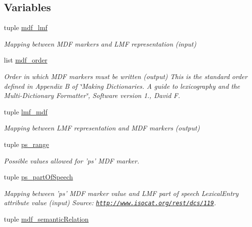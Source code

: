 \subsection*{Variables}
\begin{DoxyCompactItemize}
\item 
tuple \hyperlink{namespacelmf_1_1src_1_1config_1_1mdf_a888cd9df8b9511d408e646dc404b5232}{mdf\+\_\+lmf}
\begin{DoxyCompactList}\small\item\em Mapping between M\+D\+F markers and L\+M\+F representation (input) \end{DoxyCompactList}\item 
list \hyperlink{namespacelmf_1_1src_1_1config_1_1mdf_afe5efb72442beb65b5083335b744845c}{mdf\+\_\+order}
\begin{DoxyCompactList}\small\item\em Order in which M\+D\+F markers must be written (output) This is the standard order defined in Appendix B of \char`\"{}\+Making Dictionaries. A guide to lexicography and the Multi-\/\+Dictionary Formatter\char`\"{}, Software version 1., David F. \end{DoxyCompactList}\item 
tuple \hyperlink{namespacelmf_1_1src_1_1config_1_1mdf_a78d8f1444783c1b86cbbd91f49a0cd4f}{lmf\+\_\+mdf}
\begin{DoxyCompactList}\small\item\em Mapping between L\+M\+F representation and M\+D\+F markers (output) \end{DoxyCompactList}\item 
tuple \hyperlink{namespacelmf_1_1src_1_1config_1_1mdf_a59bb4fce205d8159bc72c946e3855c4a}{ps\+\_\+range}
\begin{DoxyCompactList}\small\item\em Possible values allowed for 'ps' M\+D\+F marker. \end{DoxyCompactList}\item 
tuple \hyperlink{namespacelmf_1_1src_1_1config_1_1mdf_a1e76a452fc77f05851e4369134f5980b}{ps\+\_\+part\+Of\+Speech}
\begin{DoxyCompactList}\small\item\em Mapping between 'ps' M\+D\+F marker value and L\+M\+F part of speech Lexical\+Entry attribute value (input) Source\+: \href{http://www.isocat.org/rest/dcs/119}{\tt http\+://www.\+isocat.\+org/rest/dcs/119}. \end{DoxyCompactList}\item 
tuple \hyperlink{namespacelmf_1_1src_1_1config_1_1mdf_a20455cbc7aa64cc6eb4ad1749a381738}{mdf\+\_\+semantic\+Relation}

\end{DoxyCompactItemize}
